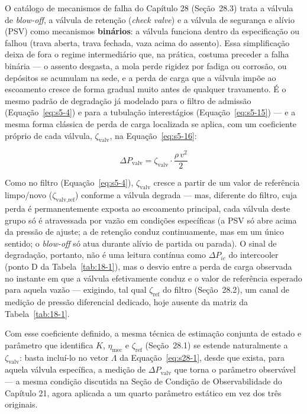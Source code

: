 \documentclass[12pt,a4paper]{article}
\numberwithin{equation}{section}
\numberwithin{table}{section}
\numberwithin{figure}{section}
\begin{document}
{	O catálogo de mecanismos de falha do Capítulo 28 (Seção~28.3) trata a válvula de \textit{blow-off}, a válvula de retenção (\textit{check valve}) e a válvula de segurança e alívio (PSV) como mecanismos \textbf{binários}: a válvula funciona dentro da especificação ou falhou (trava aberta, trava fechada, vaza acima do assento). Essa simplificação deixa de fora o regime intermediário que, na prática, costuma preceder a falha binária — o assento desgasta, a mola perde rigidez por fadiga ou corrosão, ou depósitos se acumulam na sede, e a perda de carga que a válvula impõe ao escoamento cresce de forma gradual muito antes de qualquer travamento. É o mesmo padrão de degradação já modelado para o filtro de admissão (Equação~\eqref{eq:s5-4}) e para a tubulação interestágios (Equação~\eqref{eq:s5-15}) — e a mesma forma clássica de perda de carga localizada se aplica, com um coeficiente próprio de cada válvula, $\zeta_{\text{valv}}$, na Equação~\eqref{eq:s5-16}:

	\begin{equation}\label{eq:s5-16}
	\Delta P_{\text{valv}} = \zeta_{\text{valv}} \cdot \frac{\rho \, v^2}{2}
	\end{equation}

	Como no filtro (Equação~\eqref{eq:s5-4}), $\zeta_{\text{valv}}$ cresce a partir de um valor de referência limpo/novo ($\zeta_{\text{valv,ref}}$) conforme a válvula degrada — mas, diferente do filtro, cuja perda é permanentemente exposta ao escoamento principal, cada válvula deste grupo só é atravessada por vazão em condições específicas (a PSV só abre acima da pressão de ajuste; a de retenção conduz continuamente, mas em um único sentido; o \textit{blow-off} só atua durante alívio de partida ou parada). O sinal de degradação, portanto, não é uma leitura contínua como $\Delta P_{ic}$ do intercooler (ponto D da Tabela~\ref{tab:18-1}), mas o desvio entre a perda de carga observada no instante em que a válvula efetivamente conduz e o valor de referência esperado para aquela vazão — exigindo, tal qual $\zeta_{\text{ref}}$ do filtro (Seção~28.2), um canal de medição de pressão diferencial dedicado, hoje ausente da matriz da Tabela~\ref{tab:18-1}.

	Com esse coeficiente definido, a mesma técnica de estimação conjunta de estado e parâmetro que identifica $K$, $\eta_{\text{mec}}$ e $\zeta_{\text{ref}}$ (Seção~28.1) se estende naturalmente a $\zeta_{\text{valv}}$: basta incluí-lo no vetor $\Lambda$ da Equação~\eqref{eq:s28-1}, desde que exista, para aquela válvula específica, a medição de $\Delta P_{\text{valv}}$ que torna o parâmetro observável — a mesma condição discutida na Seção de Condição de Observabilidade do Capítulo 21, agora aplicada a um quarto parâmetro estático em vez dos três originais.

}
\end{document}
